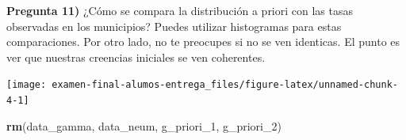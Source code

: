 \documentclass[
]{article}
\newenvironment{Shaded}{\begin{snugshade}}{\end{snugshade}}
\newcommand{\DataTypeTok}[1]{\textcolor[rgb]{0.13,0.29,0.53}{#1}}
\newcommand{\DecValTok}[1]{\textcolor[rgb]{0.00,0.00,0.81}{#1}}
\newcommand{\FloatTok}[1]{\textcolor[rgb]{0.00,0.00,0.81}{#1}}
\newcommand{\KeywordTok}[1]{\textcolor[rgb]{0.13,0.29,0.53}{\textbf{#1}}}
\newcommand{\NormalTok}[1]{#1}
\newcommand{\OperatorTok}[1]{\textcolor[rgb]{0.81,0.36,0.00}{\textbf{#1}}}
\newcommand{\StringTok}[1]{\textcolor[rgb]{0.31,0.60,0.02}{#1}}
\begin{document}
\textbf{Pregunta 11)} ¿Cómo se compara la distribución a priori con las
tasas observadas en los municipios? Puedes utilizar histogramas para
estas comparaciones. Por otro lado, no te preocupes si no se ven
identicas. El punto es ver que nuestras creencias iniciales se ven
coherentes.

\begin{Shaded}
\end{Shaded}

\begin{center}\texttt{[image: examen-final-alumos-entrega\_files/figure-latex/unnamed-chunk-4-1]} \end{center}

\begin{Shaded}
\begin{Highlighting}[]
\KeywordTok{rm}\NormalTok{(data_gamma, data_neum, g_priori_}\DecValTok{1}\NormalTok{, g_priori_}\DecValTok{2}\NormalTok{)}
\end{Highlighting}
\end{Shaded}
\end{document}
